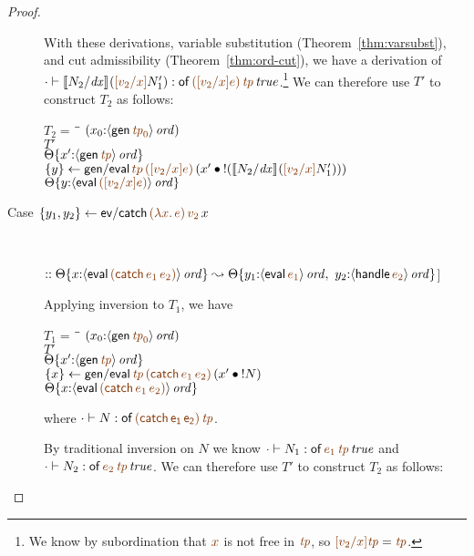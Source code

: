 \begin{proof}
\begin{description}
With these derivations, 
variable substitution (Theorem~\ref{thm:varsubst}), and cut
admissibility (Theorem~\ref{thm:ord-cut}), we have a derivation of
$\cdot \vdash \rsubst{N_2}{\it dx}{(\lf{[v_2/x]}N_1')} : \isconc{{\sf
  of}\,\lf{([v_2/x]e)}\,\lf{\it tp}}$.\footnote{We know by
  subordination that $\lf{x}$ is not free in $\lf{\it tp}$, so
  $\lf{[v_2/x]{\it tp}} = \lf{\it tp}$.}  We can therefore use $T'$ to
construct $T_2$ as follows:
\begin{tabbing}
$T_2 = ~$ \= \qquad \= $(x_0{:}\istrue{\susp{{\sf gen}\,\lf{{\it tp}_0}}})$
\\
\>$T'$
\\
\>\>$\tackon{\Theta}{x'{:}\istrue{\susp{{\sf gen}\,\lf{\it tp}}}}$
\\
\>$\trstep{y}
     {{\sf gen/eval}\,\lf{tp}\,\lf{([v_2/x]e)}\,(\tfuser{x'}{\tbangr{(\rsubst{N_2}{\it
  dx}{(\lf{[v_2/x]}N_1')})}})}$
\\
\>\>$\tackon{\Theta}{y{:}\istrue{\susp{{\sf eval}\,\lf{([v_2/x]e)}}}}$
\end{tabbing}

\item 
  [Case $\trstep{y_1,y_2}{{\sf ev/catch}\,\lf{(\lambda x.\,e)}\,\lf{v_2}\,x}$]~
 
\qquad $:: \tackon{\Theta}{x{:}\istrue{\susp{{\sf eval}\,\lf{({\sf catch}\,e_1\,e_2)}}}}
       \leadsto 
        \tackon{\Theta}{y_1{:}\istrue{\susp{{\sf eval}\,\lf{e_1}}}, ~
                   y_2{:}\istrue{\susp{{\sf handle}\,\lf{e_2}}}}$]~

\medskip
Applying inversion to $T_1$, we have

\begin{tabbing}
$T_1 = ~$ \= \qquad \= $(x_0{:}\istrue{\susp{{\sf gen}\,\lf{{\it tp}_0}}})$
\\
\>$T'$
\\
\>\>$\tackon{\Theta}{x'{:}\istrue{\susp{{\sf gen}\,\lf{{\it tp}}}}}$
\\
\>$\trstep{x}
     {{\sf gen/eval}\,\lf{\it tp}\,\lf{({\sf catch}\,e_1\,e_2)}\,(\tfuser{x'}{\tbangr{N}})}$
\\
\>\>$\tackon{\Theta}{x{:}\istrue{\susp{{\sf eval}\,\lf{({\sf catch}\,e_1\,e_2)}}}}$
\end{tabbing}
where $\cdot \vdash N : \sf of\,\lf{({\sf catch}\,e_1\,e_2)}\,\lf{\it tp}$. 

\medskip
By traditional inversion  on $N$ we 
know
 $\cdot \vdash N_1 : \isconc{{\sf of}\,\lf{e_1}\,\lf{\it tp}}$ and 
$\cdot \vdash N_2 :
\isconc{{\sf of}\,\lf{e_2}\,\lf{\it tp}}$.
We can therefore use $T'$ to construct $T_2$ as follows:


\end{description}
\end{proof}
